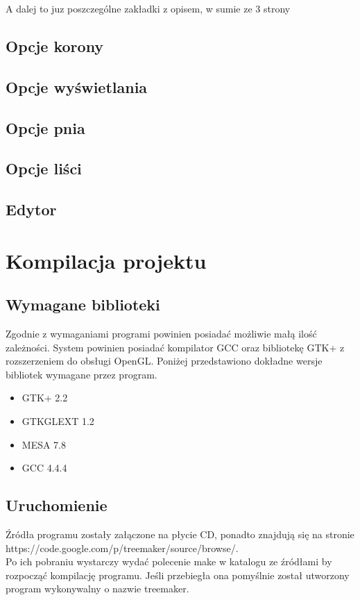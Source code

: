 A dalej to juz poszczególne zakładki z opisem, w sumie ze 3 strony
\subsection{Opcje korony}
\subsection{Opcje wyświetlania}
\subsection{Opcje pnia}
\subsection{Opcje liści}
\subsection{Edytor}
\section{Kompilacja projektu}
\subsection{Wymagane biblioteki}
Zgodnie z wymaganiami programi powinien posiadać możliwie małą ilość zależności. System powinien posiadać kompilator GCC oraz bibliotekę GTK+ z rozszerzeniem do obsługi OpenGL.
Poniżej przedstawiono dokładne wersje bibliotek wymagane przez program.
\begin{itemize}
\item GTK+ 2.2
\item GTKGLEXT 1.2
\item MESA 7.8
\item GCC 4.4.4
\end{itemize}
\subsection{Uruchomienie}
Źródła programu zostały załączone na płycie CD, ponadto znajdują się na stronie https://code.google.com/p/treemaker/source/browse/.\\
Po ich pobraniu wystarczy wydać polecenie make w katalogu ze źródłami by rozpocząć kompilację programu. Jeśli przebiegła ona pomyślnie został utworzony
program wykonywalny o nazwie treemaker.
